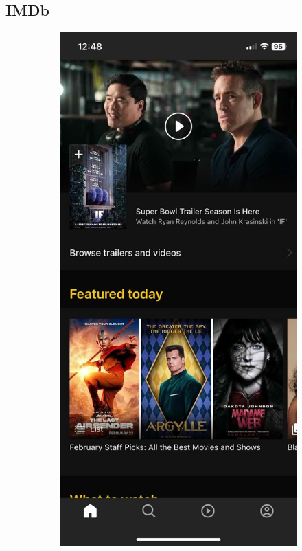 \subsection{IMDb}
\begin{figure} [h]
    \centering
    \begin{subfigure}{.3\linewidth}
      \centering
      \includegraphics[width = \linewidth]{mainmatter/images/imdb1.jpg}

\end{subfigure}
\end{figure}
